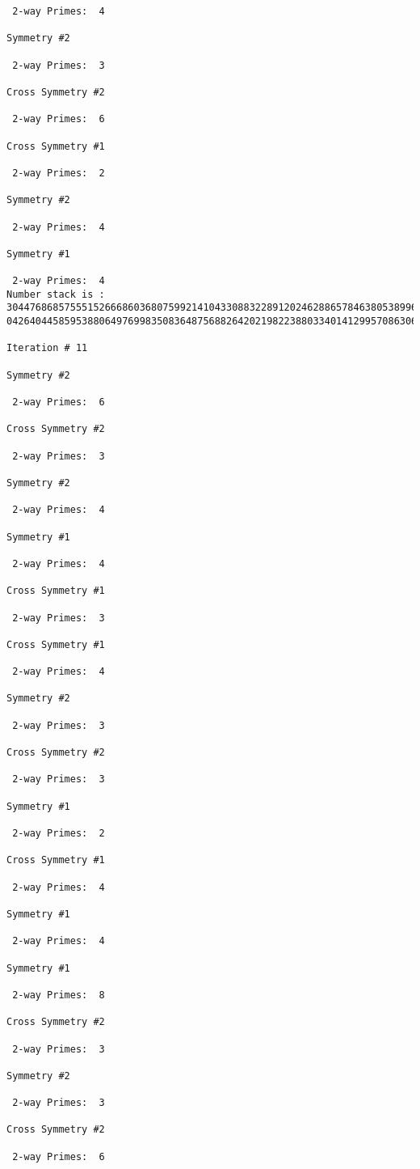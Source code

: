{{{{\begin{verbatim}
 2-way Primes: 	4

Symmetry #2

 2-way Primes: 	3

Cross Symmetry #2

 2-way Primes: 	6

Cross Symmetry #1

 2-way Primes: 	2

Symmetry #2

 2-way Primes: 	4

Symmetry #1

 2-way Primes: 	4
Number stack is :
30447686857555152666860368075992141043308832289120246288657846380538996794608835958544046240163340857
04264044585953880649769983508364875688264202198223880334014129957086306866625155575868674403758043361

Iteration #	11

Symmetry #2

 2-way Primes: 	6

Cross Symmetry #2

 2-way Primes: 	3

Symmetry #2

 2-way Primes: 	4

Symmetry #1

 2-way Primes: 	4

Cross Symmetry #1

 2-way Primes: 	3

Cross Symmetry #1

 2-way Primes: 	4

Symmetry #2

 2-way Primes: 	3

Cross Symmetry #2

 2-way Primes: 	3

Symmetry #1

 2-way Primes: 	2

Cross Symmetry #1

 2-way Primes: 	4

Symmetry #1

 2-way Primes: 	4

Symmetry #1

 2-way Primes: 	8

Cross Symmetry #2

 2-way Primes: 	3

Symmetry #2

 2-way Primes: 	3

Cross Symmetry #2

 2-way Primes: 	6


\end{verbatim}}}}}
